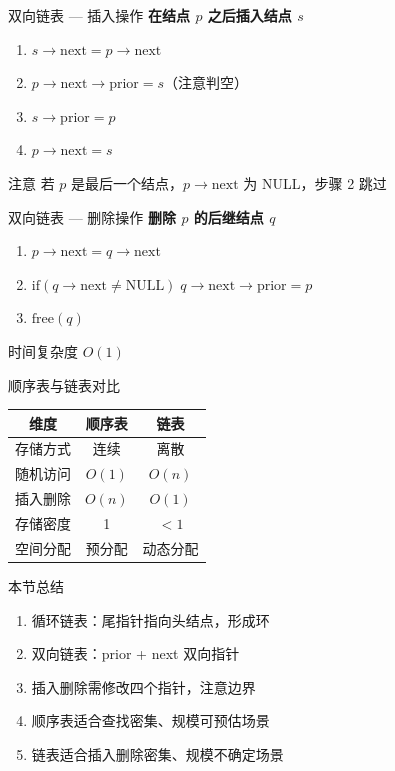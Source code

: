 \documentclass[10pt, aspectratio=169]{beamer}
\begin{document}
\begin{frame}{双向链表 --- 插入操作}
    \textbf{在结点 $p$ 之后插入结点 $s$}
    \vspace{0.5em}
    \begin{enumerate}
        \item $s \to \text{next} = p \to \text{next}$
        \item $p \to \text{next} \to \text{prior} = s$（注意判空）
        \item $s \to \text{prior} = p$
        \item $p \to \text{next} = s$
    \end{enumerate}
    \vspace{0.5em}
    \begin{alertblock}{注意}
        若 $p$ 是最后一个结点，$p \to \text{next}$ 为 NULL，步骤 2 跳过
    \end{alertblock}
\end{frame}

\begin{frame}{双向链表 --- 删除操作}
    \textbf{删除 $p$ 的后继结点 $q$}
    \vspace{0.5em}
    \begin{enumerate}
        \item $p \to \text{next} = q \to \text{next}$
        \item $\text{if}(q \to \text{next} \ne \text{NULL}) \; q \to \text{next} \to \text{prior} = p$
        \item $\text{free}(q)$
    \end{enumerate}
    \vspace{0.5em}
    时间复杂度 $O(1)$
\end{frame}

\begin{frame}{顺序表与链表对比}
    \begin{center}
    \begin{tabular}{|c|c|c|}
        \hline
        \textbf{维度} & \textbf{顺序表} & \textbf{链表} \\
        \hline
        存储方式 & 连续 & 离散 \\
        \hline
        随机访问 & $O(1)$ & $O(n)$ \\
        \hline
        插入删除 & $O(n)$ & $O(1)$ \\
        \hline
        存储密度 & 1 & $< 1$ \\
        \hline
        空间分配 & 预分配 & 动态分配 \\
        \hline
    \end{tabular}
    \end{center}
\end{frame}

\begin{frame}{本节总结}
    \begin{enumerate}
        \item 循环链表：尾指针指向头结点，形成环
        \item 双向链表：prior + next 双向指针
        \item 插入删除需修改四个指针，注意边界
        \item 顺序表适合查找密集、规模可预估场景
        \item 链表适合插入删除密集、规模不确定场景
    \end{enumerate}
\end{frame}
\end{document}
